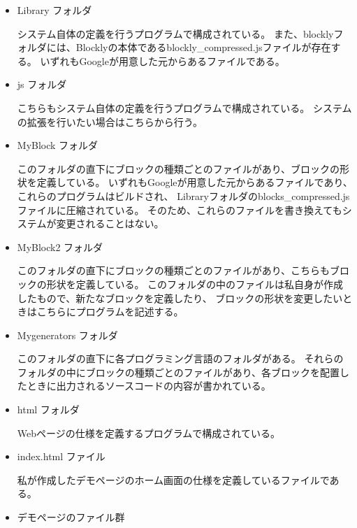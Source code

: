 \documentclass{eniepaper}
\begin{document}
\begin{itemize}

\item Library フォルダ

システム自体の定義を行うプログラムで構成されている。
また、blocklyフォルダには、Blocklyの本体であるblockly\_compressed.jsファイルが存在する。
いずれもGoogleが用意した元からあるファイルである。

\item js フォルダ

こちらもシステム自体の定義を行うプログラムで構成されている。
システムの拡張を行いたい場合はこちらから行う。

\item MyBlock フォルダ

このフォルダの直下にブロックの種類ごとのファイルがあり、ブロックの形状を定義している。
いずれもGoogleが用意した元からあるファイルであり、これらのプログラムはビルドされ、
Libraryフォルダのblocks\_compressed.jsファイルに圧縮されている。
そのため、これらのファイルを書き換えてもシステムが変更されることはない。

\item MyBlock2 フォルダ

このフォルダの直下にブロックの種類ごとのファイルがあり、こちらもブロックの形状を定義している。
このフォルダの中のファイルは私自身が作成したもので、新たなブロックを定義したり、
ブロックの形状を変更したいときはこちらにプログラムを記述する。

  \newpage

\item Mygenerators フォルダ

このフォルダの直下に各プログラミング言語のフォルダがある。
それらのフォルダの中にブロックの種類ごとのファイルがあり、各ブロックを配置したときに出力されるソースコードの内容が書かれている。

\item html フォルダ

Webページの仕様を定義するプログラムで構成されている。

\item index.html ファイル

私が作成したデモページのホーム画面の仕様を定義しているファイルである。

\item デモページのファイル群


\end{itemize} 
   
\end{document}
